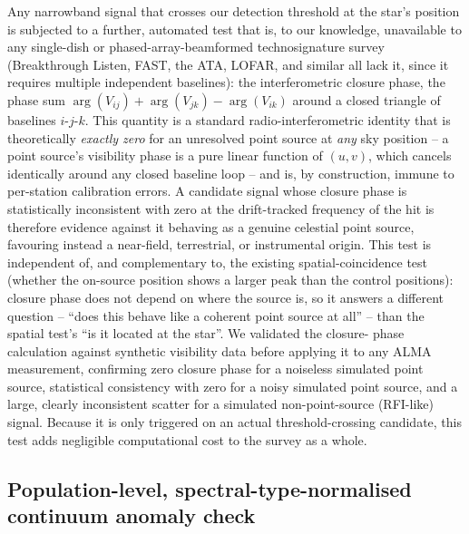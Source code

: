 \documentclass{openjournal}
\begin{document}
Any narrowband signal that crosses our detection threshold at the star's
position is subjected to a further, automated test that is, to our
knowledge, unavailable to any single-dish or phased-array-beamformed
technosignature survey (Breakthrough Listen, FAST, the ATA, LOFAR, and
similar all lack it, since it requires multiple independent baselines):
the interferometric closure phase, the phase sum
$\arg(V_{ij}) + \arg(V_{jk}) - \arg(V_{ik})$ around a closed triangle of
baselines $i$-$j$-$k$. This quantity is a standard radio-interferometric
identity that is theoretically \emph{exactly zero} for an unresolved
point source at \emph{any} sky position -- a point source's visibility
phase is a pure linear function of $(u,v)$, which cancels identically
around any closed baseline loop -- and is, by construction, immune to
per-station calibration errors. A candidate signal whose closure phase is
statistically inconsistent with zero at the drift-tracked frequency of
the hit is therefore evidence against it behaving as a genuine celestial
point source, favouring instead a near-field, terrestrial, or
instrumental origin. This test is independent of, and complementary to,
the existing spatial-coincidence test (whether the on-source position
shows a larger peak than the control positions): closure phase does not
depend on where the source is, so it answers a different question --
``does this behave like a coherent point source at all'' -- than the
spatial test's ``is it located at the star''. We validated the closure-
phase calculation against synthetic visibility data before applying it to
any ALMA measurement, confirming zero closure phase for a noiseless
simulated point source, statistical consistency with zero for a noisy
simulated point source, and a large, clearly inconsistent scatter for a
simulated non-point-source (RFI-like) signal. Because it is only
triggered on an actual threshold-crossing candidate, this test adds
negligible computational cost to the survey as a whole.

\subsection{Population-level, spectral-type-normalised continuum anomaly check}
\label{sec:popanomaly}
\end{document}
